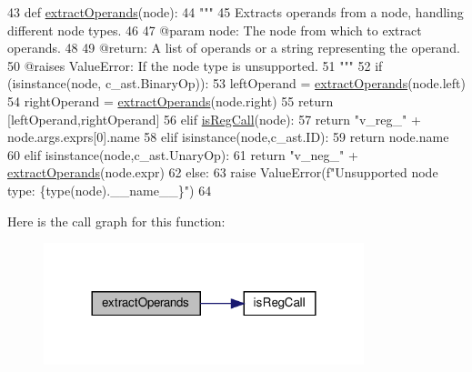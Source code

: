 \begin{DoxyCode}
43 \textcolor{keyword}{def }\hyperlink{namespacePostProcessor_1_1utils_a756305ef1f9ed9b8a0f01428433e026e}{extractOperands}(node):
44     \textcolor{stringliteral}{"""
}
45 \textcolor{stringliteral}{    Extracts operands from a node, handling different node types.
}
46 \textcolor{stringliteral}{
}
47 \textcolor{stringliteral}{    @param node: The node from which to extract operands.
}
48 \textcolor{stringliteral}{
}
49 \textcolor{stringliteral}{    @return: A list of operands or a string representing the operand.
}
50 \textcolor{stringliteral}{    @raises ValueError: If the node type is unsupported.
}
51 \textcolor{stringliteral}{    """}
52     \textcolor{keywordflow}{if} (isinstance(node, c\_ast.BinaryOp)):
53         leftOperand = \hyperlink{namespacePostProcessor_1_1utils_a756305ef1f9ed9b8a0f01428433e026e}{extractOperands}(node.left) 
54         rightOperand = \hyperlink{namespacePostProcessor_1_1utils_a756305ef1f9ed9b8a0f01428433e026e}{extractOperands}(node.right)
55         \textcolor{keywordflow}{return} [leftOperand,rightOperand]
56     \textcolor{keywordflow}{elif} \hyperlink{namespacePostProcessor_1_1utils_a89d6f2461251261de6b862c69fe3c44a}{isRegCall}(node):
57         \textcolor{keywordflow}{return} \textcolor{stringliteral}{"v\_reg\_"} + node.args.exprs[0].name
58     \textcolor{keywordflow}{elif} isinstance(node,c\_ast.ID):
59         \textcolor{keywordflow}{return} node.name
60     \textcolor{keywordflow}{elif} isinstance(node,c\_ast.UnaryOp):
61         \textcolor{keywordflow}{return} \textcolor{stringliteral}{"v\_neg\_"} + \hyperlink{namespacePostProcessor_1_1utils_a756305ef1f9ed9b8a0f01428433e026e}{extractOperands}(node.expr)
62     \textcolor{keywordflow}{else}:
63         \textcolor{keywordflow}{raise} ValueError(f\textcolor{stringliteral}{"Unsupported node type: \{type(node).\_\_name\_\_\}"})
64     
\end{DoxyCode}
Here is the call graph for this function\+:\nopagebreak
\begin{figure}[H]
\begin{center}
\leavevmode
\includegraphics[width=264pt]{namespacePostProcessor_1_1utils_a756305ef1f9ed9b8a0f01428433e026e_cgraph}
\end{center}
\end{figure}
